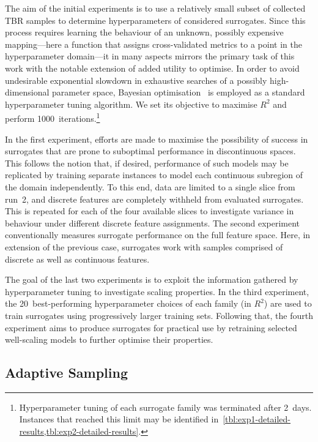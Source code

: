 The aim of the initial experiments is to use a relatively small subset of
collected TBR samples to determine hyperparameters of considered surrogates.
Since this process requires learning the behaviour of an unknown, possibly
expensive mapping---here a function that assigns cross-validated metrics to a
point in the hyperparameter domain---it in many aspects mirrors
the primary task of this work with the notable extension of added utility
to optimise. In order to avoid undesirable exponential slowdown in exhaustive
searches of a possibly high-dimensional parameter space, Bayesian
optimisation~\cite{movckus1975bayesian} is employed as a standard hyperparameter tuning algorithm. We set
its objective to maximise $R^2$ and perform
1000~iterations.\footnote{Hyperparameter tuning of each surrogate family was
	terminated after 2~days. Instances that reached this limit may be identified
	in~\cref{tbl:exp1-detailed-results,tbl:exp2-detailed-results}.}

In the first experiment, efforts are made to maximise the possibility of success
in surrogates that are prone to suboptimal performance in discontinuous spaces.
This follows the notion that, if desired, performance of such models may be
replicated by training separate instances to model each continuous subregion of
the domain independently.
To this end, data are limited to a single slice from run~2, and discrete
features are completely withheld from evaluated
surrogates. This is repeated for each of the four available slices to
investigate variance in behaviour under different discrete feature assignments.
The second experiment conventionally measures surrogate performance on the full
feature space. Here, in extension of the previous case, surrogates work with
samples comprised of discrete as well as continuous features.

The goal of the last two experiments is to exploit the information gathered by
hyperparameter tuning to investigate scaling properties. In
the third experiment, the 20~best-performing hyperparameter choices of each family
(in $R^2$) are used to train surrogates using progressively larger training sets. Following
that, the fourth experiment aims to produce surrogates for practical use by
retraining selected well-scaling models to further optimise their properties.


\subsection{Adaptive Sampling}
\label{sec:adaptive}

